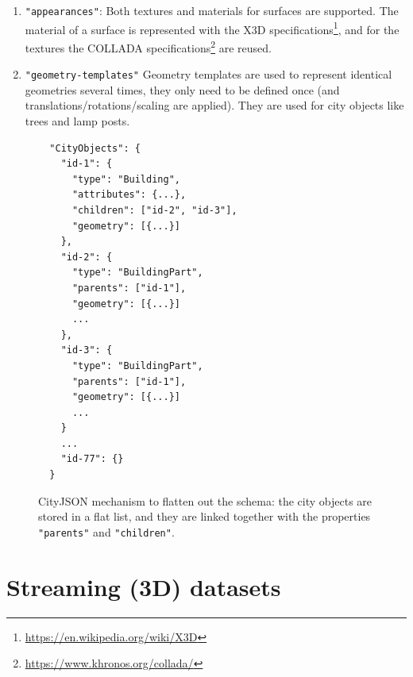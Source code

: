 \documentclass{isprs} %
\newcommand{\eg}{eg}
\begin{document}
\begin{enumerate}
  There are several advantages to this approach.
  First, the files can be compressed: 3D vertices are often shared by several surfaces, and repeating them can be costly, especially if they are very precise (sub-millimetre precision is often used).
  Second, this approach increases the topological relationships that are explicitly stored in the file, and several operations (\eg\ are 2 buildings adjacent?) can be sped up and made more robust.
  Third, it is very easy to convert to a representation listing all coordinates; the inverse is not true. 
  However, this is where the streaming of geometries is problematic: the array of "vertices" contains several millions vertices, especially for very large areas, .
  To be able to reconstruct one Building, all the \texttt{"vertices"} need to be in memory, which means waiting for millions of unused vertices to be loaded.
  \item \texttt{"appearances"}: Both textures and materials for surfaces are supported.  
  The material of a surface is represented with the X3D specifications\footnote{\url{https://en.wikipedia.org/wiki/X3D}}, and for the textures the COLLADA specifications\footnote{\url{https://www.khronos.org/collada/}} are reused.
  \item \texttt{"geometry-templates"} 
  Geometry templates are used to represent identical geometries several times, they only need to be defined once (and translations/rotations/scaling are applied).
  They are used for city objects like trees and lamp posts. 
\end{enumerate}


\begin{figure}
  \centering
\begin{lstlisting}
  "CityObjects": {
    "id-1": {
      "type": "Building",
      "attributes": {...},
      "children": ["id-2", "id-3"],
      "geometry": [{...}]
    },
    "id-2": {
      "type": "BuildingPart",
      "parents": ["id-1"],
      "geometry": [{...}]
      ...
    },
    "id-3": {
      "type": "BuildingPart",
      "parents": ["id-1"],
      "geometry": [{...}]
      ...
    }
    ...
    "id-77": {}
  }
\end{lstlisting}
  \caption{CityJSON mechanism to flatten out the schema: the city objects are stored in a flat list, and they are linked together with the properties \texttt{"parents"} and \texttt{"children"}.}%
\label{fig:parents_children}
\end{figure}




%
\section{Streaming (3D) datasets}%
\label{sec:streaming}
\end{document}
